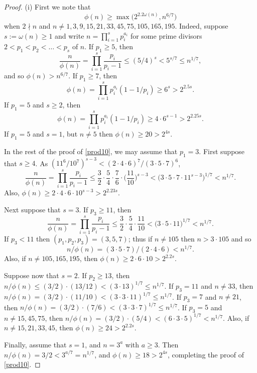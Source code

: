 \documentclass[11pt]{amsart}
\theoremstyle{plain}
\theoremstyle{definition}
\numberwithin{thm}{section}
\numberwithin{equation}{thm}
\newcommand{\0}{\emptyset}
\begin{document}
\begin{proof}
(i) First we note that
\begin{equation}\label{prod10}
  \phi(n) \geq \max\bigl(2^{2.2\omega(n)},n^{6/7}\bigr)
\end{equation}
when $2 \nmid n$ and $n \neq 1,3,9,15,21,33,45,75,105,165,195$. Indeed, suppose $s:=\omega(n) \geq 1$ and write 
$n=\prod^s_{i=1}p_i^{a_i}$ for some prime divisors $2 < p_1 < p_2 < \ldots < p_s$ of $n$. If $p_1 \geq 5$, then
$$\frac{n}{\phi(n)} = \prod^s_{i=1}\frac{p_i}{p_i-1} \leq (5/4)^s < 5^{s/7} \leq n^{1/7},$$
and so $\phi(n) > n^{6/7}$. If $p_1 \geq 7$, then 
$$\phi(n) = \prod^s_{i=1}p_i^{a_i}(1-1/p_i) \geq 6^s > 2^{2.5s}.$$ 
If $p_1=5$ and $s \geq 2$, then
$$\phi(n) = \prod^s_{i=1}p_i^{a_i}(1-1/p_i) \geq 4 \cdot 6^{s-1} > 2^{2.25s}.$$
If $p_1=5$ and $s=1$, but $n \neq 5$ then $\phi(n) \geq 20 > 2^{4s}$. 

In the rest of the proof of \eqref{prod10}, we may assume that $p_1=3$. First suppose that $s \geq 4$. As
$(11^6/10^7)^{s-3} <  (2 \cdot 4 \cdot 6)^7/(3 \cdot 5 \cdot 7)^6$, %
$$\frac{n}{\phi(n)} = \prod^s_{i=1}\frac{p_i}{p_i-1} \leq \frac{3}{2} \cdot \frac{5}{4} \cdot \frac{7}{6} \cdot \bigl(\frac{11}{10}\bigr)^{s-3} < 
   \bigl( 3 \cdot 5 \cdot 7 \cdot 11^{s-3} \bigr)^{1/7} < n^{1/7}.$$
Also, $\phi(n) \geq 2 \cdot 4 \cdot 6 \cdot 10^{s-3} > 2^{2.23s}$.    

Next suppose that $s = 3$. If $p_3 \geq 11$, then 
$$\frac{n}{\phi(n)} = \prod^s_{i=1}\frac{p_i}{p_i-1} \leq \frac{3}{2} \cdot \frac{5}{4} \cdot \frac{11}{10} < 
   \bigl( 3 \cdot 5 \cdot 11 \bigr)^{1/7} < n^{1/7}.$$ 
If $p_3 < 11$ then $(p_1,p_2,p_3)=(3,5,7)$; thus if $n \neq 105$ then $n > 3 \cdot 105$ and so
$$n/\phi(n) = (3 \cdot 5 \cdot 7)/(2 \cdot 4 \cdot 6) < n^{1/7}.$$    
Also, if $n \neq 105, 165,195$, then $\phi(n) \geq 2 \cdot 6 \cdot 10 > 2^{2.2s}$.  

Suppose now that $s = 2$. If $p_2 \geq 13$, then 
$n/\phi(n) \leq (3/2) \cdot (13/12) < (3 \cdot 13)^{1/7} \leq n^{1/7}$. 
If $p_3 = 11$ and $n \neq 33$, then $n/\phi(n) = (3/2) \cdot (11/10) < (3\cdot 3 \cdot 11)^{1/7} \leq n^{1/7}$. 
If $p_3 = 7$ and $n \neq 21$, then $n/\phi(n) = (3/2) \cdot (7/6) < (3\cdot 3 \cdot 7)^{1/7} \leq n^{1/7}$. 
If $p_3 = 5$ and $n \neq 15,45,75$, then $n/\phi(n) = (3/2) \cdot (5/4) < (6\cdot 3 \cdot 5)^{1/7} < n^{1/7}$. 
Also, if $n \neq 15, 21,33,45$, then $\phi(n) \geq 24 > 2^{2.2s}$.  

Finally, assume that $s=1$, and $n=3^a$ with $a \geq 3$. Then $n/\phi(n) = 3/2 < 3^{a/7} = n^{1/7}$, and 
$\phi(n) \geq 18 > 2^{4s}$, completing the proof of \eqref{prod10}. 


\end{proof}
\end{document}
